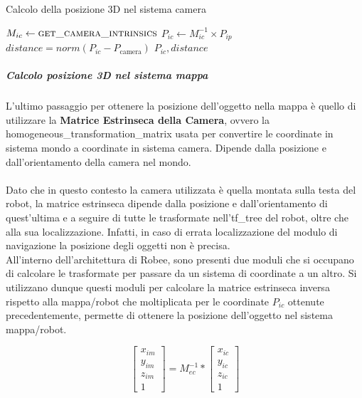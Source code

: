 \begin{algorithm}[h]
  \caption{Calcolo della posizione 3D nel sistema camera}
  \begin{algorithmic}[1]
    \State $M_{ic} \gets \Call{get\_camera\_intrinsics}{}$ 
    \State $P_{ic} \gets M_{ic}^{-1} \times P_{ip}$
    \State $distance = norm(P_{ic} - P_{\text{camera}})$
    \State \Return $P_{ic}, distance$
    \EndProcedure
  \end{algorithmic}
\end{algorithm}

\subparagraph{Calcolo posizione 3D nel sistema mappa}
L'ultimo passaggio per ottenere la posizione dell'oggetto nella mappa è quello di utilizzare la \textbf{Matrice Estrinseca della Camera}, ovvero la \gls{homogeneous_transformation_matrix} usata per convertire le coordinate in sistema mondo a coordinate in sistema camera. Dipende dalla posizione e dall'orientamento della camera nel mondo. \\\\
Dato che in questo contesto la camera utilizzata è quella montata sulla testa del robot, la matrice estrinseca dipende dalla posizione e dall'orientamento di quest'ultima e a seguire di tutte le trasformate nell'\gls{tf_tree} del robot, oltre che alla sua localizzazione. Infatti, in caso di errata localizzazione del modulo di navigazione la posizione degli oggetti non è precisa. \\
All'interno dell'architettura di Robee, sono presenti due moduli che si occupano di calcolare le trasformate per passare da un sistema di coordinate a un altro. Si utilizzano dunque questi moduli per calcolare la matrice estrinseca inversa rispetto alla mappa/robot che moltiplicata per le coordinate $P_{ic}$ ottenute precedentemente, permette di ottenere la posizione dell'oggetto nel sistema mappa/robot.

\[
  \begin{bmatrix}
    x_{im} \\
    y_{im} \\
    z_{im} \\
    1
  \end{bmatrix}
  =
  M_{ec}^{-1}
  *
  \begin{bmatrix}
    x_{ic} \\
    y_{ic} \\
    z_{ic} \\
    1
  \end{bmatrix}
\]


